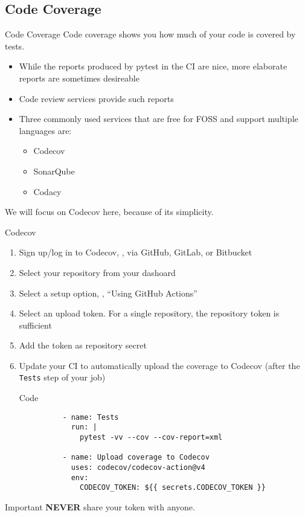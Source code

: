 \subsection{Code Coverage}
\begin{frame}[fragile]{Code Coverage}
  Code coverage shows you how much of your code is covered by tests.
  \begin{itemize}
    \item While the reports produced by pytest in the CI are nice, more elaborate reports are sometimes desireable
    \item Code review services provide such reports
    \item Three commonly used services that are free for FOSS and support multiple languages are:
      \begin{itemize}
        \item Codecov
        \item SonarQube
        \item Codacy
      \end{itemize}
  \end{itemize}
  We will focus on Codecov here, because of its simplicity.
\end{frame}

\begin{frame}[fragile]{
    Codecov
    \hfill
  }
  \begin{enumerate}
    \item Sign up/log in to Codecov, \eg, via GitHub, GitLab, or Bitbucket
    \item Select your repository from your dashoard
    \item Select a setup option, \eg, \enquote{Using GitHub Actions}
    \item Select an upload token. For a single repository, the repository
      token is sufficient
    \item Add the token as repository secret
    \item Update your CI to automatically upload the coverage to Codecov (after the \texttt{Tests} step of your job)
      \begin{block}{Code}
        \footnotesize
        \begin{verbatim}
          - name: Tests
            run: |
              pytest -vv --cov --cov-report=xml

          - name: Upload coverage to Codecov
            uses: codecov/codecov-action@v4
            env:
              CODECOV_TOKEN: ${{ secrets.CODECOV_TOKEN }}
        \end{verbatim}
      \end{block}
  \end{enumerate}
  \begin{alertblock}{Important}
    \textbf{NEVER} share your token with anyone.
  \end{alertblock}
\end{frame}

